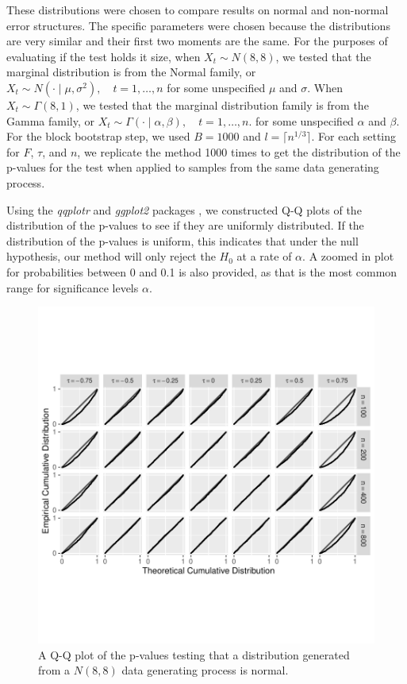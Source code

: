 \documentclass[12pt, titlepage, letterpaper]{article}
\begin{document}
{These distributions
were chosen to compare results on normal and non-normal
error structures. The specific parameters were chosen because the distributions 
are very similar and their
first two moments are the same. 
For the purposes of 
evaluating if the test holds it size, when $X_t \sim N(8, 8)$, we tested that the 
marginal distribution is from the
Normal family, or 
$X_t \sim N(\cdot \mid \mu, \sigma^2), \quad t = 1, \ldots, n$
for some unspecified $\mu$ and $\sigma$. When $X_t \sim \Gamma(8, 1)$, we tested
that the marginal distribution family is from the Gamma family,
or
$X_t \sim \Gamma(\cdot \mid \alpha, \beta), \quad t = 1, \ldots, n$.
for some unspecified $\alpha$ and $\beta$.
For the block
bootstrap step,
we used $B = 1000$ and $l = \lceil n^{1/3} \rceil$.
For each setting for $F$, $\tau$, and $n$, we replicate the method 1000 times 
to get the distribution of the p-values 
for the test when applied to samples from the same data generating process.


Using the \textsl{qqplotr} and \textsl{ggplot2} packages 
\citep{qqplotr, ggplot2},
we constructed Q-Q plots of the distribution of the p-values to see if they are
uniformly distributed. If the distribution of the p-values is uniform, this 
indicates that under the null hypothesis, our method will only reject the $H_0$
at a rate of $\alpha$.
A zoomed in plot for probabilities between 0 and 0.1 is
also provided, as
that is the most common range for significance levels $\alpha$. 

\begin{figure}[tbp]
  \centering
  \includegraphics[width = \textwidth]{figures/normal}
  \caption{A Q-Q plot of the p-values testing that a distribution
  generated from a $N(8,8)$ data generating process is normal.}
  \label{fig:normal}
\end{figure}

}
\end{document}
